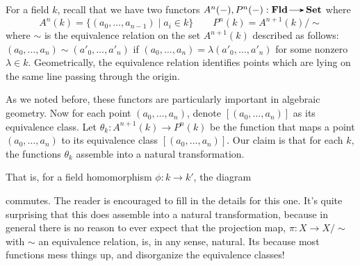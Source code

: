     \begin{example}
        For a field $k$, recall that we have two functors $A^n(-), P^n(-): \fld \to \Set$
        where 
        \[
            A^n(k) = \{(a_0, \dots, a_{n-1}) \mid a_i \in k\} 
            \qquad
            P^n(k) = A^{n+1}(k)/\sim
        \]
        where  $\sim$ is the equivalence relation on the set $A^{n+1}(k)$
        described as follows: $(a_0, \dots, a_n) \sim (a'_0, \dots, a'_n)$ 
        if $(a_0, \dots, a_n) = \lambda(a'_0, \dots, a'_n)$
        for some nonzero $\lambda \in k$. Geometrically, the equivalence relation identifies 
        points which are lying on the same line passing through the origin. 
        
        As we noted before, these functors 
        are particularly important in algebraic geometry.
        Now for each point $(a_0, \dots, a_n)$, 
        denote $[(a_0, \dots, a_n)]$ as its equivalence class.
        Let $\theta_k: A^{n+1}(k) \to P^n(k)$ be the function that maps 
        a point $(a_0, \dots, a_n)$ to its equivalence class $[(a_0, \dots, a_n)]$. 
        Our claim is that for each $k$, the functions $\theta_k$ assemble into a 
        natural transformation. 

        That is, for a field homomorphism $\phi: k \to k'$, the diagram
        \begin{center}
            \hspace{1cm}
        \end{center}
        commutes. 
        The reader is encouraged to fill in the details for this one. It's quite 
        surprising that this does assemble into a natural transformation, because in general 
        there is no reason to ever expect that the projection map, $\pi: X \to X/\sim$ with $\sim$
        an equivalence relation, is, in any sense, natural. Its 
        because most functions mess things up, and disorganize the equivalence classes! 


\end{example}
